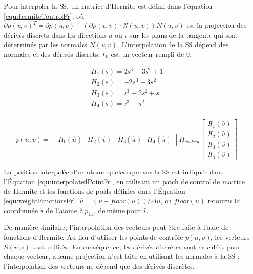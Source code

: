 Pour interpoler la SS, un matrice d'Hermite est défini dans l'équation \ref{equ:hermiteControlFr}, où $\partial p(u,v)^T = \partial p(u,v) - (\partial p(u,v) \cdot N(u, v))N(u,v)$ est la projection des dérivés discrets dans les directions $u$ où $v$ sur les plans de la tangente qui sont déterminés par les normales $N(u,v)$. 
L'interpolation de la SS dépend des normales et des dérivés discrets; $h_{0}$ est un vecteur rempli de $0$.

\begin{equation}
 \begin{array}{l}
  H_1(s)= 2s^3 - 3s^2 + 1\\
  H_2(s)= -2s^3 + 3s^2\\
  H_3(s)= s^3 - 2s^2 + s\\
  H_4(s)= s^3 - s^2\\
 \end{array}
\label{equ:weightFunctionsFr}
\end{equation}

\begin{equation}
 p(u, v) = \left [ \begin{array}{cccc} H_1(\hat u) & H_2(\hat u) & H_3(\hat u) & H_4(\hat u) \end{array} \right ]
                H_{control}
           \left [ \begin{array}{c} H_1(\hat v) \\
				     H_2(\hat v) \\ 
				     H_3(\hat v) \\ 
				     H_4(\hat v) 
		    \end{array} \right ]
\label{equ:interpolatedPointFr}
\end{equation}

La position interpolée d'un atome quelconque sur la SS est indiquée dans l'Équation \ref{equ:interpolatedPointFr}, en utilisant un patch de control de matrice de Hermite et les fonctions de poids définies dans l'Équation \ref{equ:weightFunctionsFr}.
$\hat u = (u - floor(u)) / \Delta u$, où $floor(u)$ retourne la coordonnée $u$ de l'atome à $p_{11}$, de même pour $\hat v$.

De manière similaire, l'interpolation des vecteurs peut être faite à l'aide de fonctions d'Hermite. 
Au lieu d'utiliser les points de contrôle
$p (u, v)$, les vecteurs $S (u, v)$ sont utilisés. 
En conséquence, les dérivés discrètes sont calculées pour chaque vecteur, 
aucune projection n'est faite en utilisant les normales à la SS ; 
l'interpolation des vecteurs ne dépend que des dérivés discrètes.

